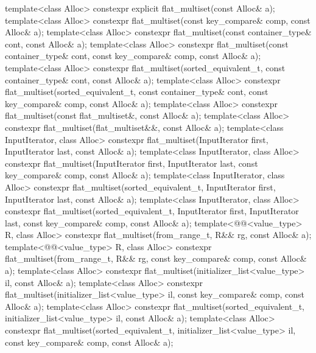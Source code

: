 \begin{codeblock}
{{    template<class Alloc>
      constexpr explicit flat_multiset(const Alloc& a);
    template<class Alloc>
      constexpr flat_multiset(const key_compare& comp, const Alloc& a);
    template<class Alloc>
      constexpr flat_multiset(const container_type& cont, const Alloc& a);
    template<class Alloc>
      constexpr flat_multiset(const container_type& cont, const key_compare& comp,
                              const Alloc& a);
    template<class Alloc>
      constexpr flat_multiset(sorted_equivalent_t, const container_type& cont, const Alloc& a);
    template<class Alloc>
      constexpr flat_multiset(sorted_equivalent_t, const container_type& cont,
                              const key_compare& comp, const Alloc& a);
    template<class Alloc>
      constexpr flat_multiset(const flat_multiset&, const Alloc& a);
    template<class Alloc>
      constexpr flat_multiset(flat_multiset&&, const Alloc& a);
    template<class InputIterator, class Alloc>
      constexpr flat_multiset(InputIterator first, InputIterator last, const Alloc& a);
    template<class InputIterator, class Alloc>
      constexpr flat_multiset(InputIterator first, InputIterator last,
                              const key_compare& comp, const Alloc& a);
    template<class InputIterator, class Alloc>
      constexpr flat_multiset(sorted_equivalent_t, InputIterator first, InputIterator last,
                              const Alloc& a);
    template<class InputIterator, class Alloc>
      constexpr flat_multiset(sorted_equivalent_t, InputIterator first, InputIterator last,
                              const key_compare& comp, const Alloc& a);
    template<@@<value_type> R, class Alloc>
      constexpr flat_multiset(from_range_t, R&& rg, const Alloc& a);
    template<@@<value_type> R, class Alloc>
      constexpr flat_multiset(from_range_t, R&& rg, const key_compare& comp, const Alloc& a);
    template<class Alloc>
      constexpr flat_multiset(initializer_list<value_type> il, const Alloc& a);
    template<class Alloc>
      constexpr flat_multiset(initializer_list<value_type> il, const key_compare& comp,
                              const Alloc& a);
    template<class Alloc>
      constexpr flat_multiset(sorted_equivalent_t, initializer_list<value_type> il,
                              const Alloc& a);
    template<class Alloc>
      constexpr flat_multiset(sorted_equivalent_t, initializer_list<value_type> il,
                              const key_compare& comp, const Alloc& a);

}}
\end{codeblock}
